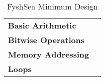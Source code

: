 \newcommand{\fy}[2]{%
	\textbf{#1} & #2 \\%
	\hline%
}
\begin{table}[H]
	\begin{tabularx}{\textwidth}{| a | x |}
		\hline
		 &  \\
		\hline
		\fy{Basic Arithmetic}{}
		\fy{Bitwise Operations}{}
		\fy{Memory Addressing}{}
		\fy{Loops}{}
	\end{tabularx}
	\label{Tab:fysh}
	\caption{FyshSea Minimum Design}
\end{table}

